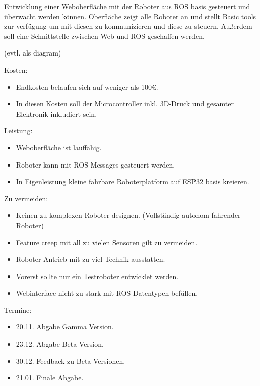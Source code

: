 \begin{flushleft}
    Entwicklung einer Weboberfläche mit der Roboter aus ROS basis gesteuert und überwacht werden können.
    Oberfläche zeigt alle Roboter an und stellt Basic tools zur verfügung um mit diesen zu kommunizieren
    und diese zu steuern.
    Außerdem soll eine Schnittstelle zwischen Web und ROS geschaffen werden.

    (evtl. als diagram)

    Kosten:
    \begin{itemize}
    \item Endkosten belaufen sich auf weniger als 100€.
    \item In diesen Kosten soll der Microcontroller inkl. 3D-Druck und gesamter Elektronik inkludiert sein.
    \end{itemize}

    Leistung:
    \begin{itemize}
    \item Weboberfläche ist lauffähig.
    \item Roboter kann mit ROS-Messages gesteuert werden.
    \item In Eigenleistung kleine fahrbare Roboterplatform auf ESP32 basis kreieren.
    \end{itemize}
        
    Zu vermeiden:
    \begin{itemize}
    \item Keinen zu komplexen Roboter designen. (Vollständig autonom fahrender Roboter)
    \item Feature creep mit all zu vielen Sensoren gilt zu vermeiden.
    \item Roboter Antrieb mit zu viel Technik ausstatten.
    \item Vorerst sollte nur ein Testroboter entwicklet werden.
    \item Webinterface nicht zu stark mit ROS Datentypen befüllen.
    \end {itemize}

    Termine:
    \begin{itemize}
    \item 20.11. Abgabe Gamma Version.
    \item 23.12. Abgabe Beta Version.
    \item 30.12. Feedback zu Beta Versionen.
    \item 21.01. Finale Abgabe.
    \end{itemize}
    
\end{flushleft}